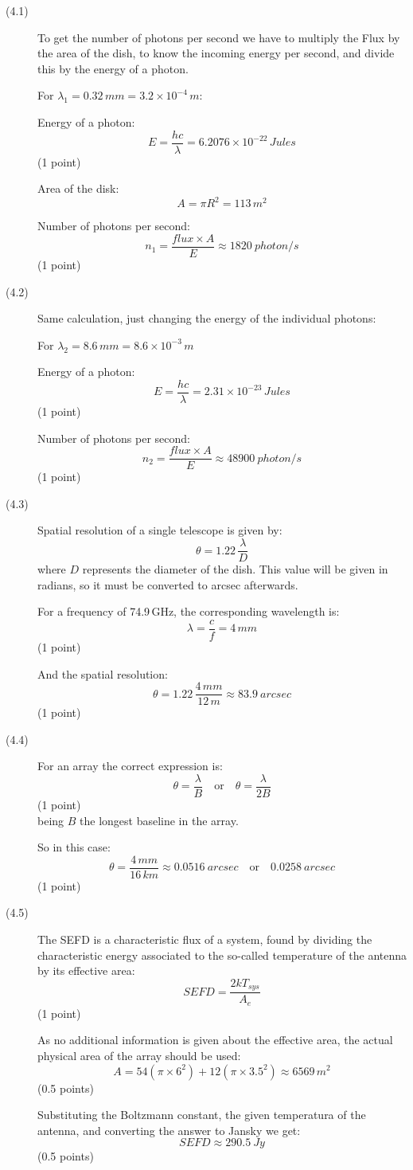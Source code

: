 \begin{description}
\item[(4.1)] To get the number of photons per second we have to multiply the
Flux by the area of the dish, to know the incoming energy per second, and
divide this by the energy of a photon.

For $\lambda_1 = 0.32\,mm = 3.2 \times 10^{-4}\,m$:

Energy of a photon:
\[ E = \frac{hc}{\lambda} = 6.2076 \times 10^{-22}\,Jules \]
\hfill(1 point)

Area of the disk:
\[ A = \pi R^2 = 113\,m^2 \]

Number of photons per second:
\[ n_1 = \frac{flux \times A}{E} \approx 1820~photon/s \]
\hfill(1 point)

\item[(4.2)] Same calculation, just changing the energy of the individual
photons:

For $\lambda_2 = 8.6\,mm = 8.6 \times 10^{-3}\,m$

Energy of a photon:
\[ E = \frac{hc}{\lambda} = 2.31 \times 10^{-23}\,Jules \]
\hfill(1 point)

Number of photons per second:
\[ n_2 = \frac{flux \times A}{E} \approx 48900~photon/s \]
\hfill(1 point)

\item[(4.3)] Spatial resolution of a single telescope is given by:
\[ \theta = 1.22\,\frac{\lambda}{D} \]
where $D$ represents the diameter of the dish. This value will be given in
radians, so it must be converted to arcsec afterwards.

For a frequency of 74.9\,GHz, the corresponding wavelength is:
\[ \lambda = \frac{c}{f} = 4\,mm \]
\hfill(1 point)

And the spatial resolution:
\[ \theta = 1.22\,\frac{4\,mm}{12\,m} \approx 83.9~arcsec \]
\hfill(1 point)

\item[(4.4)] For an array the correct expression is:
\[ \theta = \frac{\lambda}{B} \quad\text{or}\quad
   \theta = \frac{\lambda}{2B} \]
\hfill(1 point)\\
being $B$ the longest baseline in the array.

So in this case:
\[ \theta = \frac{4\,mm}{16\,km} \approx 0.0516~arcsec
   \quad\text{or}\quad 0.0258~arcsec \]
\hfill(1 point)

\item[(4.5)] The SEFD is a characteristic flux of a system, found by
dividing the characteristic energy associated to the so-called temperature of
the antenna by its effective area:
\[ SEFD = \frac{2kT_{sys}}{A_e} \]
\hfill(1 point)

As no additional information is given about the effective area, the actual
physical area of the array should be used:
\[ A = 54\left(\pi \times 6^2\right) + 12\left(\pi \times 3.5^2\right)
   \approx 6569\,m^2 \]
\hfill(0.5 points)

Substituting the Boltzmann constant, the given temperatura of the antenna,
and converting the answer to Jansky we get:
\[ SEFD \approx 290.5~Jy \]
\hfill(0.5 points)
\end{description}

